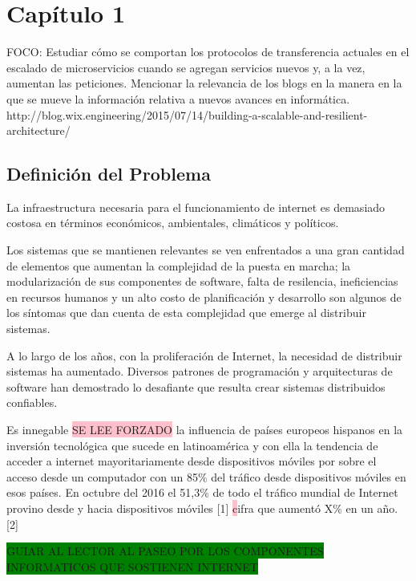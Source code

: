 \chapter{Capítulo 1}

FOCO: Estudiar cómo se comportan los protocolos de transferencia actuales en el escalado de microservicios cuando se agregan servicios nuevos y, a la vez, aumentan las peticiones.
Mencionar la relevancia de los blogs en la manera en la que se mueve la información relativa a nuevos avances en informática.
http://blog.wix.engineering/2015/07/14/building-a-scalable-and-resilient-architecture/

\section{Definición del Problema}

La infraestructura necesaria para el funcionamiento de internet es demasiado costosa en términos económicos, ambientales, climáticos y políticos.

Los sistemas que se mantienen relevantes se ven enfrentados a una gran cantidad de elementos que aumentan la complejidad de la puesta en marcha; la modularización de sus componentes de software, falta de resilencia, ineficiencias en recursos humanos y un alto costo de planificación y desarrollo son algunos de los síntomas que dan cuenta de esta complejidad que emerge al distribuir sistemas.

A lo largo de los años, con la proliferación de Internet, la necesidad de distribuir sistemas ha aumentado. Diversos patrones de programación y arquitecturas de software han demostrado lo desafiante que resulta crear sistemas distribuidos confiables. 


Es innegable \colorbox{pink}{SE LEE FORZADO} la influencia de países europeos hispanos en la inversión tecnológica que sucede en latinoamérica y con ella la tendencia de acceder a internet mayoritariamente desde dispositivos móviles por sobre el acceso desde un computador con un 85\% del tráfico desde dispositivos móviles en esos países. En octubre del 2016 el 51,3\% de todo el tráfico mundial de Internet provino desde y hacia dispositivos móviles [1] \colorbox{pink}cifra que aumentó X\% en un año. [2]

\colorbox{green}{GUIAR AL LECTOR AL PASEO POR LOS COMPONENTES INFORMATICOS QUE SOSTIENEN INTERNET}

